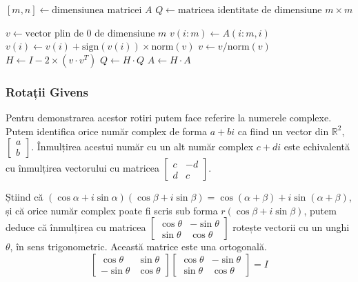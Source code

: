 \documentclass{exam}
\begin{document}
\begin{algorithm}
	\caption{Descompunerea QR cu Householder}
	\begin{algorithmic}[1]
		\State \( [m, n] \gets \text{dimensiunea matricei } A \)
		\State \( Q \gets \text{matricea identitate de dimensiune } m \times m \)

		\State \( v \gets \text{vector plin de 0 de dimensiune } m \)
		\State \( v(i:m) \gets A(i:m, i) \)
		\State \( v(i) \gets v(i) + \text{sign}(v(i)) \times \text{norm}(v) \)
		\State \( v \gets v / \text{norm}(v) \)
		\State \( H \gets I - 2 \times (v \cdot v^T) \)
		\State \( Q \gets H \cdot Q \)
		\State \( A \gets H \cdot A \)
		\EndFor
	\end{algorithmic}
\end{algorithm}

\subsubsection{Rotații Givens}

Pentru demonstrarea acestor rotiri putem face referire la numerele
complexe. Putem identifica orice număr complex de forma $a + bi$
ca fiind un vector din $\mathbb{R}^2$, $\begin{bmatrix} a \\ b \end{bmatrix}$.
Înmulțirea acestui număr cu un alt număr complex $c + di$ este echivalentă cu
înmulțirea vectorului cu matricea $\begin{bmatrix} c & -d \\ d & c \end{bmatrix}$.

Știind că $ (\cos \alpha + i \sin \alpha)(\cos \beta + i \sin \beta) = \cos(\alpha + \beta) + i \sin(\alpha + \beta)$,
și că orice număr complex poate fi scris sub forma $r(\cos \beta + i \sin \beta)$,
putem deduce că înmulțirea cu matricea $\begin{bmatrix} \cos \theta & -\sin \theta \\ \sin \theta & \cos \theta \end{bmatrix}$
rotește vectorii cu un unghi $\theta$, în sens trigonometric. Această matrice
este una ortogonală.
\begin{equation*}
	\begin{bmatrix} \cos \theta & \sin \theta \\ -\sin \theta & \cos \theta \end{bmatrix} \begin{bmatrix} \cos \theta & -\sin \theta \\ \sin \theta & \cos \theta \end{bmatrix} = I
\end{equation*}
\end{document}
